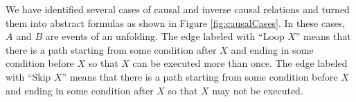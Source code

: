\documentclass{llncs}
\begin{document}
We have identified several cases of causal and inverse causal relations and turned them into abstract formulas as shown in Figure \ref{fig:causalCases}. In these cases, $A$ and $B$ are events of an unfolding. The edge labeled with ``Loop $X$'' means that there is a path starting from some condition after $X$ and ending in some condition before $X$ so that $X$ can be executed more than once. The edge labeled with ``Skip $X$'' means that there is a path starting from some condition before $X$ and ending in some condition after $X$ so that $X$ may not be executed. %

\begin{figure}[htbp]
\centering
{}
\end{figure}
\end{document}
